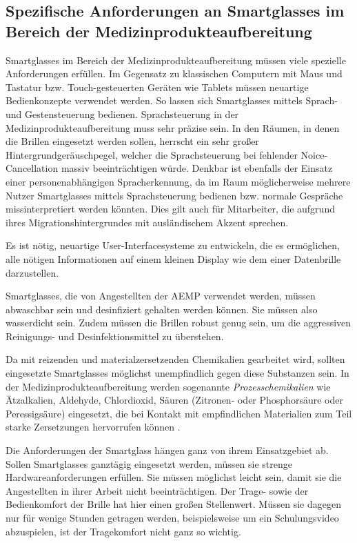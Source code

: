 \subsection{Spezifische Anforderungen an Smartglasses im Bereich der Medizinprodukteaufbereitung}
\label{sec:Spezifische_Anforderungen_an_Smartglasses}
Smartglasses im Bereich der Medizinprodukteaufbereitung müssen viele spezielle Anforderungen erfüllen. Im Gegensatz zu klassischen Computern mit Maus und Tastatur bzw. Touch-gesteuerten Geräten wie Tablets müssen neuartige Bedienkonzepte verwendet werden. So lassen sich Smartglasses mittels Sprach- und Gestensteuerung bedienen.
Sprachsteuerung in der Medizinprodukteaufbereitung muss sehr präzise sein. In den Räumen, in denen die Brillen eingesetzt werden sollen, herrscht ein sehr großer Hintergrundgeräuschpegel, welcher die Sprachsteuerung bei fehlender Noice-Cancellation massiv beeinträchtigen würde. Denkbar ist ebenfalls der Einsatz einer personenabhängigen Spracherkennung, da im Raum möglicherweise mehrere Nutzer Smartglasses mittels Sprachsteuerung bedienen bzw. normale Gespräche missinterpretiert werden könnten. Dies gilt auch für Mitarbeiter, die aufgrund ihres Migrationshintergrundes mit ausländischem Akzent sprechen.
 
Es ist nötig, neuartige User-Interfacesysteme zu entwickeln, die es ermöglichen, alle nötigen Informationen auf einem kleinen Display wie dem einer Datenbrille darzustellen. 

Smartglasses, die von Angestellten der AEMP verwendet werden, müssen abwaschbar sein und desinfiziert gehalten werden können. Sie müssen also wasserdicht sein. Zudem müssen die Brillen robust genug sein, um die aggressiven Reinigungs- und Desinfektionsmittel zu überstehen.

Da mit reizenden und materialzersetzenden Chemikalien gearbeitet wird, sollten eingesetzte Smartglasses möglichst unempfindlich gegen diese Substanzen sein. In der Medizinprodukteaufbereitung werden sogenannte \emph{Prozesschemikalien} wie Ätzalkalien, Aldehyde, Chlordioxid, Säuren (Zitronen- oder Phosphorsäure oder Peressigsäure) eingesetzt, die bei Kontakt mit empfindlichen Materialien zum Teil starke Zersetzungen hervorrufen können \cite{AKI-ArbeitskreisInstrumenten-Aufbereitung2012}.

Die Anforderungen der Smartglass hängen ganz von ihrem Einsatzgebiet ab. Sollen Smartglasses ganztägig eingesetzt werden, müssen sie strenge Hardwareanforderungen erfüllen. Sie müssen möglichst leicht sein, damit sie die Angestellten in ihrer Arbeit nicht beeinträchtigen. Der Trage- sowie der Bedienkomfort der Brille hat hier einen großen Stellenwert. Müssen sie dagegen nur für wenige Stunden getragen werden, beispielsweise um ein Schulungsvideo abzuspielen, ist der Tragekomfort nicht ganz so wichtig.

